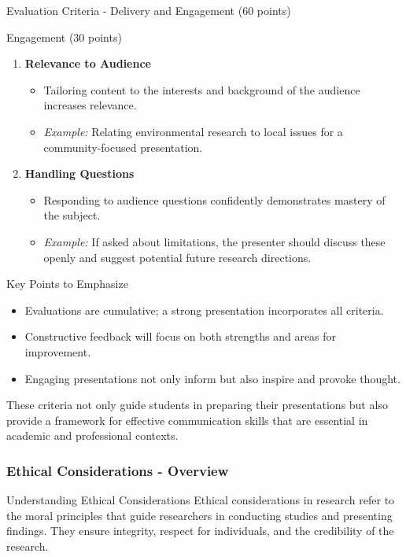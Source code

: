 \documentclass[aspectratio=169]{beamer}
\begin{document}
\begin{frame}[fragile]{Evaluation Criteria - Delivery and Engagement (60 points)}
\begin{block}{Engagement (30 points)}
\begin{enumerate}
            \item \textbf{Relevance to Audience}
            \begin{itemize}
                \item Tailoring content to the interests and background of the audience increases relevance.
                \item \textit{Example:} Relating environmental research to local issues for a community-focused presentation.
            \end{itemize}

            \item \textbf{Handling Questions}
            \begin{itemize}
                \item Responding to audience questions confidently demonstrates mastery of the subject.
                \item \textit{Example:} If asked about limitations, the presenter should discuss these openly and suggest potential future research directions.
            \end{itemize}
        \end{enumerate}
    \end{block}
\end{frame}

\begin{frame}[fragile]{Key Points to Emphasize}
    \begin{itemize}
        \item Evaluations are cumulative; a strong presentation incorporates all criteria.
        \item Constructive feedback will focus on both strengths and areas for improvement.
        \item Engaging presentations not only inform but also inspire and provoke thought.
    \end{itemize}

    These criteria not only guide students in preparing their presentations but also provide a framework for effective communication skills that are essential in academic and professional contexts.
\end{frame}

\begin{frame}[fragile]
    \frametitle{Ethical Considerations - Overview}
    \begin{block}{Understanding Ethical Considerations}
        Ethical considerations in research refer to the moral principles that guide researchers in conducting studies and presenting findings. They ensure integrity, respect for individuals, and the credibility of the research.
    \end{block}
\end{frame}
\end{document}
